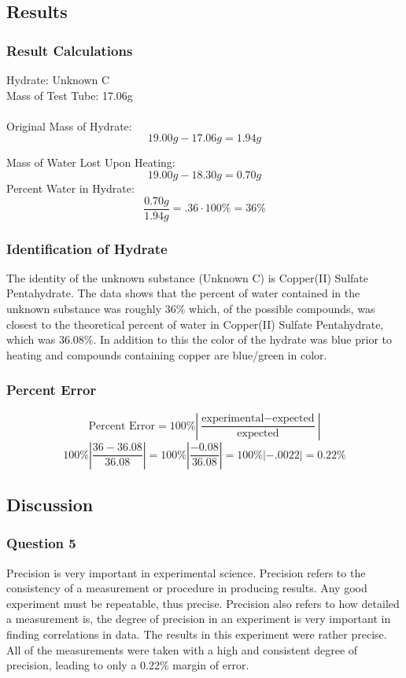 \documentclass[12pt]{article}
\begin{document}
\newpage
\subsection{Results}
\subsubsection{Result Calculations}
Hydrate: Unknown C\\
Mass of Test Tube: 17.06g
\\\\
Original Mass of Hydrate: 
\[19.00g - 17.06g = 1.94g\]

Mass of Water Lost Upon Heating:
\[19.00g - 18.30g = 0.70g\]
Percent Water in Hydrate:
\[\frac{0.70g}{1.94g}=.36\cdot 100\% = 36\%\]

\subsubsection{Identification of Hydrate}
The identity of the unknown substance (Unknown C) is Copper(II) Sulfate Pentahydrate. The data shows that the percent of water contained in the unknown substance was roughly 36\% which, of the possible compounds, was closest to the theoretical percent of water in Copper(II) Sulfate Pentahydrate, which was 36.08\%. In addition to this the color of the hydrate was blue prior to heating and compounds containing copper are blue/green in color.

\subsubsection{Percent Error}
\[\mbox{Percent Error}=100\%\left|\frac{\mbox{experimental}-\mbox{expected}}{\mbox{expected}}\right|\]
\[100\%\left | \frac{36-36.08}{36.08} \right |=100\%\left | \frac{-0.08}{36.08} \right |=100\%\left | -.0022 \right |=0.22\%\]

\newpage
\subsection{Discussion}
\subsubsection{Question 5}
Precision is very important in experimental science. Precision refers to the consistency of a measurement or procedure in producing results. Any good experiment must be repeatable, thus precise. Precision also refers to how detailed a measurement is, the degree of precision in an experiment is very important in finding correlations in data. The results in this experiment were rather precise. All of the measurements were taken with a high and consistent degree of precision, leading to only a 0.22\% margin of error.
\end{document}

